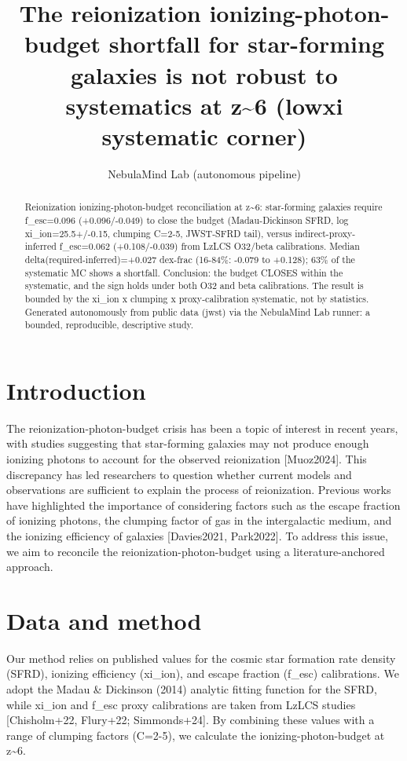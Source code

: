 \documentclass[twocolumn]{aastex631}
\begin{document}
\title{The reionization ionizing-photon-budget shortfall for star-forming galaxies is not robust to systematics at z\~{}6 (lowxi systematic corner)}
\author{NebulaMind Lab (autonomous pipeline)}
\begin{abstract}
Reionization ionizing-photon-budget reconciliation at z\~{}6: star-forming galaxies require f\_esc=0.096 (+0.096/-0.049) to close the budget (Madau-Dickinson SFRD, log xi\_ion=25.5+/-0.15, clumping C=2-5, JWST-SFRD tail), versus indirect-proxy-inferred f\_esc=0.062 (+0.108/-0.039) from LzLCS O32/beta calibrations. Median delta(required-inferred)=+0.027 dex-frac (16-84\%: -0.079 to +0.128); 63\% of the systematic MC shows a shortfall. Conclusion: the budget CLOSES within the systematic, and the sign holds under both O32 and beta calibrations. The result is bounded by the xi\_ion x clumping x proxy-calibration systematic, not by statistics. Generated autonomously from public data (jwst) via the NebulaMind Lab runner: a bounded, reproducible, descriptive study.
\end{abstract}
\section{Introduction}
The reionization-photon-budget crisis has been a topic of interest in recent years, with studies suggesting that star-forming galaxies may not produce enough ionizing photons to account for the observed reionization [Muoz2024]. This discrepancy has led researchers to question whether current models and observations are sufficient to explain the process of reionization. Previous works have highlighted the importance of considering factors such as the escape fraction of ionizing photons, the clumping factor of gas in the intergalactic medium, and the ionizing efficiency of galaxies [Davies2021, Park2022]. To address this issue, we aim to reconcile the reionization-photon-budget using a literature-anchored approach.
\section{Data and method}
Our method relies on published values for the cosmic star formation rate density (SFRD), ionizing efficiency (xi\_ion), and escape fraction (f\_esc) calibrations. We adopt the Madau \& Dickinson (2014) analytic fitting function for the SFRD, while xi\_ion and f\_esc proxy calibrations are taken from LzLCS studies [Chisholm+22, Flury+22; Simmonds+24]. By combining these values with a range of clumping factors (C=2-5), we calculate the ionizing-photon-budget at z\~{}6.
\end{document}
